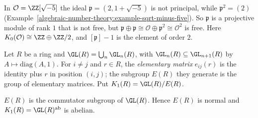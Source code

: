\begin{example}\label{k-theory:example-k-zero-sqrt-five}
In $\mathcal{O} = \ZZ[\sqrt{-5}]$ the ideal $\mathfrak{p} = (2, 1 + \sqrt{-5})$ is not principal, while $\mathfrak{p}^2 = (2)$ (Example~\ref{algebraic-number-theory:example-sqrt-minus-five}). So $\mathfrak{p}$ is a
projective module of rank $1$ that is not free, but $\mathfrak{p} \oplus \mathfrak{p} \cong \mathcal{O} \oplus \mathfrak{p}^2 \cong \mathcal{O}^2$ is free. Here $K_0(\mathcal{O}) \cong \ZZ \oplus \ZZ/2$, and $[\mathfrak{p}] - 1$ is the
element of order $2$.
\end{example}

\begin{definition}\label{k-theory:definition-k-one}
Let $R$ be a ring and $\GL(R) = \bigcup_n\GL_n(R)$, with $\GL_n(R) \subseteq \GL_{n+1}(R)$ by $A \mapsto \mathrm{diag}(A, 1)$. For $i \neq j$ and $r \in R$, the \emph{elementary matrix} $e_{ij}(r)$ is the identity
plus $r$ in position $(i, j)$; the subgroup $E(R)$ they generate is the group of elementary matrices. Put $K_1(R) = \GL(R)/E(R)$.
\end{definition}

\begin{lemma}[Whitehead]\label{k-theory:lemma-whitehead}
$E(R)$ is the commutator subgroup of $\GL(R)$. Hence $E(R)$ is normal and $K_1(R) = \GL(R)^{\mathrm{ab}}$ is abelian.
\end{lemma}

